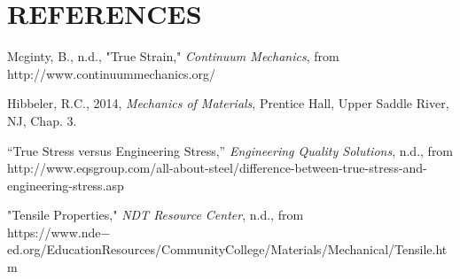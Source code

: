 \documentclass[12pt]{article}
\begin{document}
\section*{\fontsize{12}{12}\selectfont REFERENCES}

\begin{thebibliography}{2}

Mcginty, B., n.d.,
"True Strain," \emph{Continuum Mechanics}, from
http://www.continuummechanics.org/

\bibitem{}
Hibbeler, R.C., 2014, \emph{Mechanics of Materials}, Prentice Hall, Upper Saddle River, NJ, Chap. 3.

\bibitem{}
“True Stress versus Engineering Stress,” \emph{Engineering Quality Solutions}, n.d., from
http://www.eqsgroup.com/all-about-steel/difference-between-true-stress-and-engineering-stress.asp

\bibitem{}
"Tensile Properties," \emph{NDT Resource Center}, n.d., from
\\https://www.nde$-$ed.org/EducationResources/CommunityCollege/Materials/Mechanical/Tensile.htm

\end{thebibliography}


\end{document}
